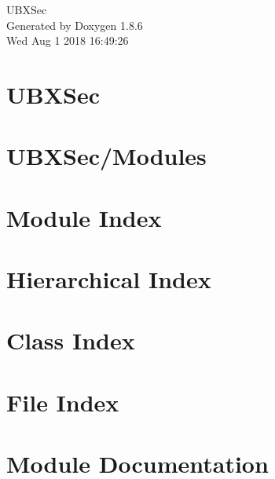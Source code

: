 \documentclass[twoside]{book}
\newcommand{\clearemptydoublepage}{%
  \newpage{\pagestyle{empty}\cleardoublepage}%
}
\begin{document}
\hypersetup{pageanchor=false}
\begin{titlepage}
\vspace*{7cm}
\begin{center}%
{\Large U\-B\-X\-Sec }\\
\vspace*{1cm}
{\large Generated by Doxygen 1.8.6}\\
\vspace*{0.5cm}
{\small Wed Aug 1 2018 16:49:26}\\
\end{center}
\end{titlepage}
\clearemptydoublepage
\tableofcontents
\clearemptydoublepage
{}
\hypersetup{pageanchor=true}

\chapter{U\-B\-X\-Sec}
\label{md__home_travis_build_marcodeltutto_UBXSec_README}
\hypertarget{md__home_travis_build_marcodeltutto_UBXSec_README}{}

\chapter{U\-B\-X\-Sec/\-Modules}
\label{md__home_travis_build_marcodeltutto_UBXSec_Modules_README}
\hypertarget{md__home_travis_build_marcodeltutto_UBXSec_Modules_README}{}

\chapter{Module Index}

\chapter{Hierarchical Index}

\chapter{Class Index}

\chapter{File Index}

\chapter{Module Documentation}


\end{document}

